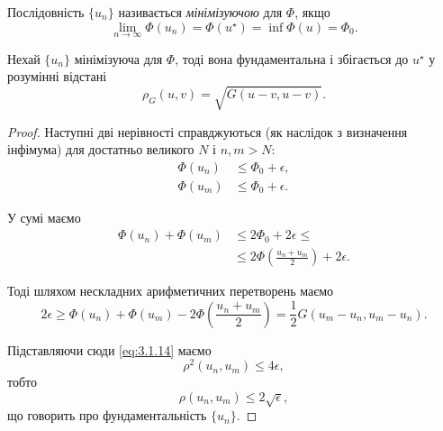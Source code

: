 \begin{definition}
    Послідовність $\{u_n\}$ називається \textit{мінімізуючою} для $\Phi$, якщо
    \begin{equation*}
        \lim_{n \to \infty} \Phi(u_n) = \Phi(u^\star) = \inf \Phi(u) = \Phi_0.
    \end{equation*}
\end{definition}

\begin{theorem}
    Нехай $\{u_n\}$ мінімізуюча для $\Phi$, тоді вона фундаментальна і збігається до $u^\star$ у розумінні відстані
    \begin{equation}
        \label{eq:3.1.14}
        \rho_G(u, v) = \sqrt{G(u - v, u - v)}.
    \end{equation}
\end{theorem}
\begin{proof}
    Наступні дві нерівності справджуються (як наслідок з визначення інфімума) для достатньо великого $N$ і $n,m>N$:
    \begin{align*}
        \Phi(u_n) &\le \Phi_0 + \epsilon, \\
        \Phi(u_m) &\le \Phi_0 + \epsilon.
    \end{align*}
    
    У сумі маємо
    \begin{equation*}
        \begin{aligned}
            \Phi(u_n) + \Phi(u_m) 
            &\le 2 \Phi_0 + 2 \epsilon \le \\
            &\le 2 \Phi \left( \frac{u_n + u_m}{2} \right) + 2 \epsilon.
        \end{aligned}
    \end{equation*}
    
    Тоді шляхом нескладних арифметичних перетворень маємо
    \begin{equation}
        \label{eq:3.1.15}
        2 \epsilon \ge \Phi(u_n) + \Phi(u_m) - 2 \Phi \left( \frac{u_n + u_m}{2} \right) = \frac{1}{2} G(u_m - u_n, u_m - u_n).
    \end{equation}
    
    Підставляючи сюди \eqref{eq:3.1.14} маємо
    \begin{equation}
        \label{eq:3.1.16}
        \rho^2(u_n, u_m) \le 4 \epsilon,
    \end{equation}
    тобто
    \begin{equation*}
        \rho(u_n, u_m) \le 2 \sqrt{\epsilon},
    \end{equation*}
    що говорить про фундаментальність $\{u_n\}$.
\end{proof}
    
